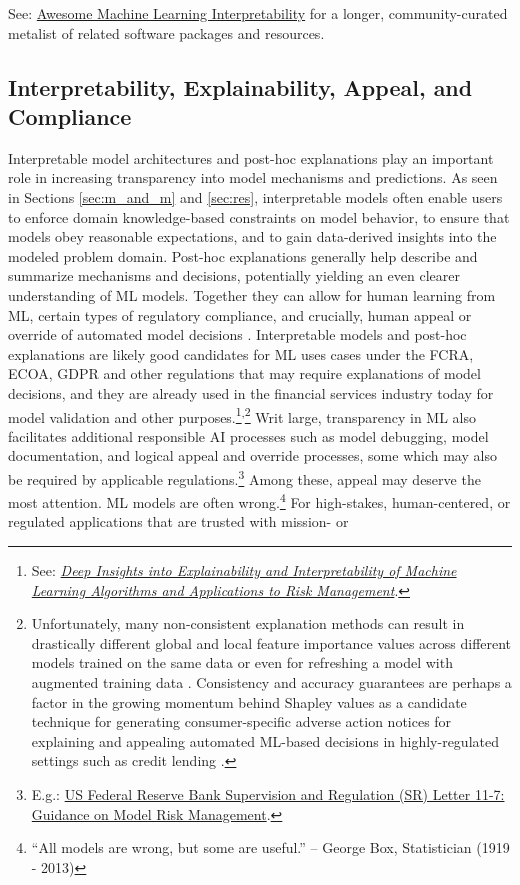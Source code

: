 \documentclass[information,article,submit,moreauthors,pdftex]{definitions/mdpi}
\begin{document}
\noindent See: \href{https://github.com/jphall663/awesome-machine-learning-interpretability}{Awesome Machine Learning Interpretability} for a longer, community-curated metalist of related software packages and resources. 

\subsection{Interpretability, Explainability, Appeal, and Compliance}

Interpretable model architectures and post-hoc explanations play an important role in increasing transparency into model mechanisms and predictions. As seen in Sections \ref{sec:m_and_m} and \ref{sec:res}, interpretable models often enable users to enforce domain knowledge-based constraints on model behavior, to ensure that models obey reasonable expectations, and to gain data-derived insights into the modeled problem domain. Post-hoc explanations generally help describe and summarize mechanisms and decisions, potentially yielding an even clearer understanding of ML models. Together they can allow for human learning from ML, certain types of regulatory compliance, and crucially, human appeal or override of automated model decisions \cite{art_and_sci}. Interpretable models and post-hoc explanations are likely good candidates for ML uses cases under the FCRA, ECOA, GDPR and other regulations that may require explanations of model decisions, and they are already used in the financial services industry today for model validation and other purposes.\footnote{See: \href{https://ww2.amstat.org/meetings/jsm/2019/onlineprogram/AbstractDetails.cfm?abstractid=303053}{\textit{Deep Insights into Explainability and Interpretability of Machine Learning Algorithms and Applications to Risk Management}}.}\textsuperscript{,}\footnote{Unfortunately, many non-consistent explanation methods can result in drastically different global and local feature importance values across different models trained on the same data or even for refreshing a model with augmented training data \cite{molnar}. Consistency and accuracy guarantees are perhaps a factor in the growing momentum behind Shapley values as a candidate technique for generating consumer-specific adverse action notices for explaining and appealing automated ML-based decisions in highly-regulated settings such as credit lending \cite{bracke2019machine}.} Writ large, transparency in ML also facilitates additional responsible AI processes such as model debugging, model documentation, and logical appeal and override processes, some which may also be required by applicable regulations.\footnote{E.g.: \href{https://www.federalreserve.gov/supervisionreg/srletters/sr1107.htm}{US Federal Reserve Bank Supervision and Regulation (SR) Letter 11-7: Guidance on Model Risk Management}.} Among these, appeal may deserve the most attention. ML models are often wrong.\footnote{``All models are wrong, but some are useful.'' -- George Box, Statistician (1919 - 2013)} For high-stakes, human-centered, or regulated applications that are trusted with mission- or 
\end{document}
